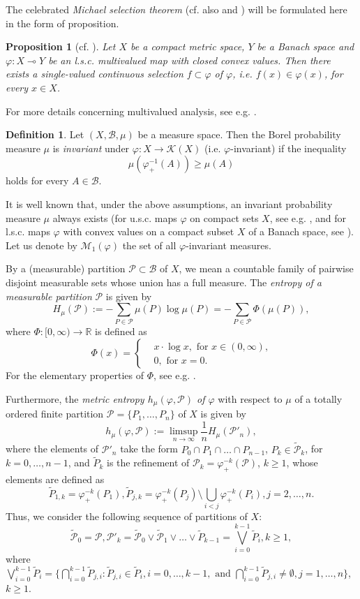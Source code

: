 \documentclass[12pt]{amsart}
\newtheorem{prop}{Proposition}
\theoremstyle{definition}
\newtheorem{definition}{Definition}
\newcommand{\K}{\mathcal{K}}
\newcommand\R{\mathbb{R}}
\newcommand{\M}{{\mathcal{M}}}
\renewcommand{\P}{{\mathcal{P}}}
\newcommand{\vp}{\varphi}
\newcommand{\B}{{\mathcal{B}}}
\begin{document}
The celebrated \emph{Michael selection theorem} \cite{Ma} (cf. also \cite[Theorem 2.1]{ATDZ} and \cite[Theorem 1.4.6]{HP}) will be formulated here in the form of proposition.

\begin{prop}[cf. \cite{Ma}]\label{p:1}
Let $X$ be a compact metric space, $Y$ be a Banach space and $\vp:X\multimap Y$ be an l.s.c. multivalued map with closed convex values. Then there exists a single-valued continuous selection $f\subset\vp$ of $\vp$, i.e. $f(x)\in\vp(x)$, for every $x\in X$.
\end{prop}

For more details concerning multivalued analysis, see e.g. \cite{AF,HP}.

\begin{definition}\label{d:2}
Let $(X,\B,\mu)$ be a measure space. Then the Borel probability measure $\mu$ is \emph{invariant} under $\vp:X\to\K(X)$ (i.e. $\vp$-invariant) if the inequality
\[
\mu(\vp^{-1}_+(A)) \geq \mu(A)
\]
holds for every $A\in\B$.
\end{definition}

It is well known that, under the above assumptions, an invariant probability measure $\mu$ always exists (for u.s.c. maps $\vp$ on compact sets $X$, see e.g. \cite[Theorem 8.9.4]{AF}, and for l.s.c. maps $\vp$ with convex values on a compact subset $X$ of a Banach space, see \cite[Theorem 2.7]{TWY}). Let us denote by $\M_1(\vp)$ the set of all $\vp$-invariant measures.

By a (measurable) partition $\P\subset\B$ of $X$, we mean a countable family of pairwise disjoint measurable sets whose union has a full measure. The \emph{entropy of a measurable partition} $\P$ is given by
\[
H_\mu(\P):= -\sum_{P\in\P}\mu(P)\log \mu(P) = -\sum_{P\in\P} \Phi(\mu(P)),
\]
where $\Phi:[0,\infty)\to\R$ is defined as
\[
\Phi(x) =
\begin{cases}
&x\cdot\log x,\mbox{ for $x\in(0,\infty)$,}\\
&0,\mbox{ for $x=0$.}
\end{cases}
\]
For the elementary properties of $\Phi$, see e.g. \cite[Theorem 4.2]{Wa}.

Furthermore, the \emph{metric entropy $h_\mu(\vp,\P)$ of $\vp$} with respect to $\mu$ of a totally ordered finite partition $\P=\{P_1,\ldots,P_n\}$ of $X$ is given by
\[
h_\mu(\vp,\P) := \limsup_{n\to\infty} \frac1{n} H_\mu(\P'_n),
\]
where the elements of $\P'_n$ take the form $P_0\cap P_1\cap\ldots\cap P_{n-1}$, $P_k\in\tilde{\P}_k$, for $k=0,\ldots,n-1$, and $\tilde{P}_k$ is the refinement of $\P_k=\vp^{-k}_+(\P)$, $k\geq 1$, whose elements are defined as
\[
\tilde{P}_{1,k} = \vp^{-k}_+(P_1), \tilde{P}_{j,k} = \vp^{-k}_+(P_j)\setminus\bigcup_{i<j} \vp^{-k}_+(P_i), j=2,\ldots,n.
\]
Thus, we consider the following sequence of partitions of $X$:
\[
\tilde{\P}_0=\P, \P'_k = \tilde{\P}_0\vee\tilde{\P}_1\vee\ldots\vee\tilde{P}_{k-1} = \bigvee_{i=0}^{k-1} \tilde{P}_i, k\geq 1,
\]
where $\bigvee_{i=0}^{k-1} \tilde{P}_i = \{\bigcap_{i=0}^{k-1}\tilde{P}_{j,i}:\tilde{P}_{j,i}\in\tilde{P}_i, i=0,\ldots,k-1,\mbox{ and } \bigcap_{i=0}^{k-1}\tilde{P}_{j,i}\neq\emptyset, j=1,\ldots,n\}$, $k\geq 1$.
\end{document}
